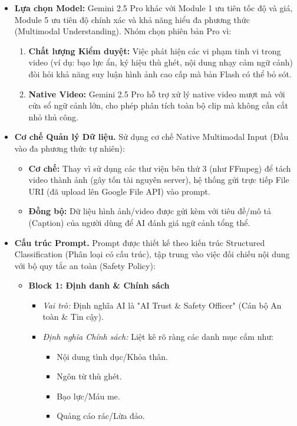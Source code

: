\begin{itemize}
    \item \textbf{Lựa chọn Model:} Gemini 2.5 Pro khác với Module 1 ưu tiên tốc độ và giá, Module 5 ưu tiên độ chính xác và khả năng hiểu đa phương thức (Multimodal Understanding). Nhóm chọn phiên bản Pro vì:
    \begin{enumerate}[label=\arabic*., leftmargin=*]
        \item \textbf{Chất lượng Kiểm duyệt:} Việc phát hiện các vi phạm tinh vi trong video (ví dụ: bạo lực ẩn, ký hiệu thù ghét, nội dung nhạy cảm ngữ cảnh) đòi hỏi khả năng suy luận hình ảnh cao cấp mà bản Flash có thể bỏ sót.
        
        \item \textbf{Native Video:} Gemini 2.5 Pro hỗ trợ xử lý native video mượt mà với cửa sổ ngữ cảnh lớn, cho phép phân tích toàn bộ clip mà không cần cắt nhỏ thủ công.
    \end{enumerate}

    \item \textbf{Cơ chế Quản lý Dữ liệu.} Sử dụng cơ chế Native Multimodal Input (Đầu vào đa phương thức tự nhiên):
    \begin{itemize}
        \item \textbf{Cơ chế:} Thay vì sử dụng các thư viện bên thứ 3 (như FFmpeg) để tách video thành ảnh (gây tốn tài nguyên server), hệ thống gửi trực tiếp File URI (đã upload lên Google File API) vào prompt.
        \item \textbf{Đồng bộ:} Dữ liệu hình ảnh/video được gửi kèm với tiêu đề/mô tả (Caption) của người dùng để AI đánh giá ngữ cảnh tổng thể.
    \end{itemize}

    \item \textbf{Cấu trúc Prompt.} Prompt được thiết kế theo kiến trúc Structured Classification (Phân loại có cấu trúc), tập trung vào việc đối chiếu nội dung với bộ quy tắc an toàn (Safety Policy):
    \begin{itemize}
        \item \textbf{Block 1: Định danh \& Chính sách}
        \begin{itemize}
            \item \textit{Vai trò:} Định nghĩa AI là "AI Trust \& Safety Officer" (Cán bộ An toàn \& Tin cậy).
            \item \textit{Định nghĩa Chính sách:} Liệt kê rõ ràng các danh mục cấm như:
            \begin{itemize}
                \item Nội dung tình dục/Khỏa thân.
                \item Ngôn từ thù ghét.
                \item Bạo lực/Máu me.
                \item Quảng cáo rác/Lừa đảo.
            \end{itemize}
        \end{itemize}
        

\end{itemize}
\end{itemize}
